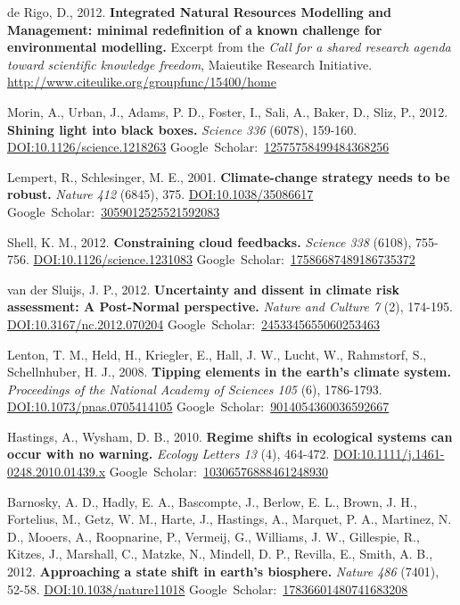 \documentclass[a4paper,11pt]{article}
\newcommand{\gourl}[1]{\url{#1}}
\newcommand{\goDOI}[1]{\href{http://dx.doi.org/#1}{DOI:#1}}
\newcommand{\goScholar}[1]{{Google~Scholar}:~\href{http://scholar.google.com/scholar?cluster=#1}{#1}}
\begin{document}
\begin{footnotesize}
{\begin{thebibliography}{}
 de Rigo, D., 2012. \textbf{Integrated Natural Resources Modelling and Management: minimal redefinition of a known challenge for environmental modelling.} Excerpt from the \emph{Call for a shared research agenda toward scientific knowledge freedom}, Maieutike Research Initiative. \gourl {http://www.citeulike.org/groupfunc/15400/home}

 Morin, A., Urban, J., Adams, P. D., Foster, I., Sali, A., Baker, D., Sliz, P., 2012. \textbf{Shining light into black boxes.} \emph{Science 336} (6078), 159-160. \goDOI{10.1126/science.1218263} \goScholar{12575758499484368256}


 Lempert, R., Schlesinger, M. E., 2001. \textbf{Climate-change strategy needs to be robust.} \emph{Nature 412} (6845), 375. \goDOI{10.1038/35086617} \goScholar{3059012525521592083}

 Shell, K. M., 2012. \textbf{Constraining cloud feedbacks.} \emph{Science 338} (6108), 755-756. \goDOI{10.1126/science.1231083} \goScholar{17586687489186735372}

 van der Sluijs, J. P., 2012. \textbf{Uncertainty and dissent in climate risk assessment: A Post-Normal perspective.} \emph{Nature and Culture 7} (2), 174-195. \goDOI{10.3167/nc.2012.070204} \goScholar{2453345655060253463}

 Lenton, T. M., Held, H., Kriegler, E., Hall, J. W., Lucht, W., Rahmstorf, S., Schellnhuber, H. J., 2008. \textbf{Tipping elements in the earth's climate system.} \emph{Proceedings of the National Academy of Sciences 105} (6), 1786-1793. \goDOI{10.1073/pnas.0705414105} \goScholar{9014054360036592667}

 Hastings, A., Wysham, D. B., 2010. \textbf{Regime shifts in ecological systems can occur with no warning.} \emph{Ecology Letters 13} (4), 464-472. \goDOI{10.1111/j.1461-0248.2010.01439.x} \goScholar{10306576888461248930}

 Barnosky, A. D., Hadly, E. A., Bascompte, J., Berlow, E. L., Brown, J. H., Fortelius, M., Getz, W. M., Harte, J., Hastings, A., Marquet, P. A., Martinez, N. D., Mooers, A., Roopnarine, P., Vermeij, G., Williams, J. W., Gillespie, R., Kitzes, J., Marshall, C., Matzke, N., Mindell, D. P., Revilla, E., Smith, A. B., 2012. \textbf{Approaching a state shift in earth's biosphere.} \emph{Nature 486} (7401), 52-58. \goDOI{10.1038/nature11018} \goScholar{17836601480741683208}



\end{thebibliography}}
\end{footnotesize}
\end{document}
